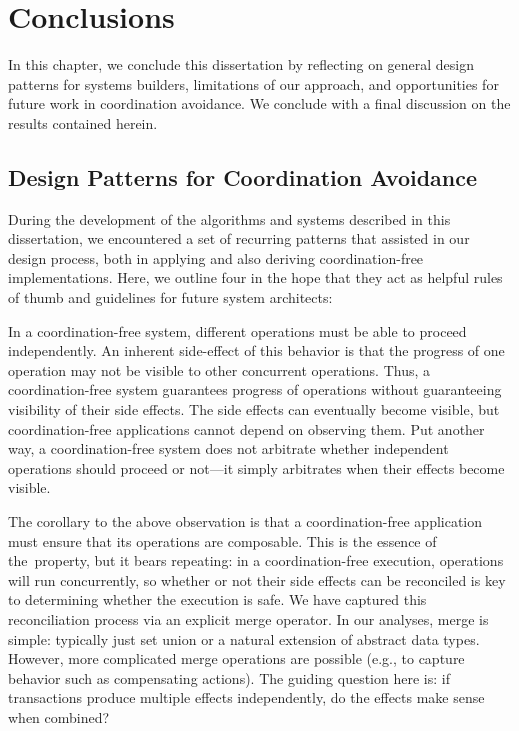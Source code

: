 
\chapter{Conclusions}
\label{c.conclusion}

In this chapter, we conclude this dissertation by reflecting on
general design patterns for systems builders, limitations of our
approach, and opportunities for future work in coordination
avoidance. We conclude with a final discussion on the results
contained herein.

\section{Design Patterns for Coordination Avoidance}

During the development of the algorithms and systems described in this
dissertation, we encountered a set of recurring patterns that assisted
in our design process, both in applying \iconfluence and also deriving
coordination-free implementations. Here, we outline four in the hope
that they act as helpful rules of thumb and guidelines for future
system architects:

 In a coordination-free
system, different operations must be able to proceed independently. An
inherent side-effect of this behavior is that the progress of one
operation may not be visible to other concurrent operations. Thus, a
coordination-free system guarantees progress of operations without
guaranteeing visibility of their side effects. The side effects can
eventually become visible, but coordination-free applications cannot
depend on observing them. Put another way, a coordination-free system
does not arbitrate whether independent operations should proceed or
not---it simply arbitrates when their effects become visible.

 The corollary to the
above observation is that a coordination-free application must ensure
that its operations are composable. This is the essence of
the~\iconfluence property, but it bears repeating: in a
coordination-free execution, operations will run concurrently, so
whether or not their side effects can be reconciled is key to
determining whether the execution is safe. We have captured this
reconciliation process via an explicit merge operator. In our
analyses, merge is simple: typically just set union or a natural
extension of abstract data types. However, more complicated merge
operations are possible (e.g., to capture behavior such as
compensating actions). The guiding question here is: if
transactions produce multiple effects independently, do the effects
make sense when combined?

